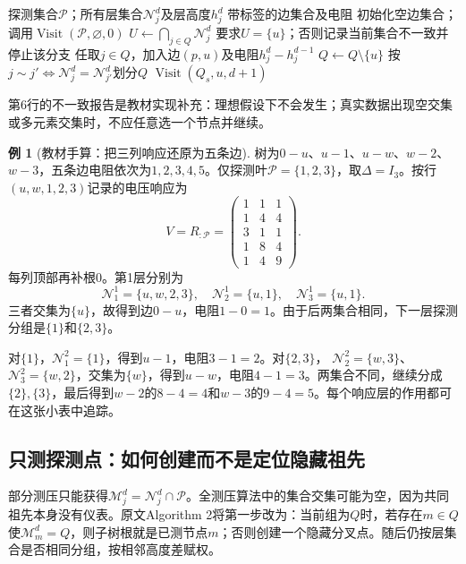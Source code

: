 \documentclass[UTF8,11pt,fontset=fandol,openany,oneside]{ctexbook}
\theoremstyle{definition}
\newtheorem{example}[theorem]{例}
\theoremstyle{remark}
\numberwithin{equation}{chapter}
\begin{document}
\begin{algorithm}[htbp]
\caption{S12全测压递归：原文Algorithm 1的统一记号重述}
\label{alg:tb-S12-full}
\begin{algorithmic}[1]
\Require 探测集合$\mathcal P$；所有层集合$\mathcal N_j^d$及层高度$h_j^d$
\Ensure 带标签的边集合及电阻
\State 初始化空边集合；调用$\operatorname{Visit}(\mathcal P,\varnothing,0)$
 \State $U\gets\bigcap_{j\in Q}\mathcal N_j^d$
 \State 要求$U=\{u\}$；否则记录当前集合不一致并停止该分支
  \State 任取$j\in Q$，加入边$(p,u)$及电阻$h_j^d-h_j^{d-1}$
 \EndIf
 \State $Q\gets Q\setminus\{u\}$
 \State 按$j\sim j'\Longleftrightarrow\mathcal N_j^d=\mathcal N_{j'}^d$划分$Q$
  \State $\operatorname{Visit}(Q_s,u,d+1)$
 \EndFor
\EndFunction
\end{algorithmic}
\end{algorithm}
第6行的不一致报告是教材实现补充：理想假设下不会发生；真实数据出现空交集或多元素交集时，不应任意选一个节点并继续。

\begin{example}[教材手算：把三列响应还原为五条边]
树为$0\!-\!u$、$u\!-\!1$、$u\!-\!w$、$w\!-\!2$、$w\!-\!3$，五条边电阻依次为$1,2,3,4,5$。仅探测叶$\mathcal P=\{1,2,3\}$，取$\Delta=I_3$。按行$(u,w,1,2,3)$记录的电压响应为
\[
 V=R_{:\mathcal P}=
 \begin{pmatrix}
 1&1&1\\1&4&4\\3&1&1\\1&8&4\\1&4&9
 \end{pmatrix}.
\]
每列顶部再补根0。第1层分别为
\[
 \mathcal N_1^1=\{u,w,2,3\},\quad
 \mathcal N_2^1=\{u,1\},\quad
 \mathcal N_3^1=\{u,1\}.
\]
三者交集为$\{u\}$，故得到边$0-u$，电阻$1-0=1$。由于后两集合相同，下一层探测分组是$\{1\}$和$\{2,3\}$。

对$\{1\}$，$\mathcal N_1^2=\{1\}$，得到$u-1$，电阻$3-1=2$。对$\{2,3\}$，
$\mathcal N_2^2=\{w,3\}$、$\mathcal N_3^2=\{w,2\}$，交集为$\{w\}$，得到$u-w$，电阻$4-1=3$。两集合不同，继续分成$\{2\},\{3\}$，最后得到$w-2$的$8-4=4$和$w-3$的$9-4=5$。每个响应层的作用都可在这张小表中追踪。
\end{example}

\subsection{只测探测点：如何创建而不是定位隐藏祖先}

部分测压只能获得$\mathcal M_j^d=\mathcal N_j^d\cap\mathcal P$。全测压算法中的集合交集可能为空，因为共同祖先本身没有仪表。原文Algorithm 2将第一步改为：当前组为$Q$时，若存在$m\in Q$使$\mathcal M_m^d=Q$，则子树根就是已测节点$m$；否则创建一个隐藏分叉点。随后仍按层集合是否相同分组，按相邻高度差赋权。
\end{document}
